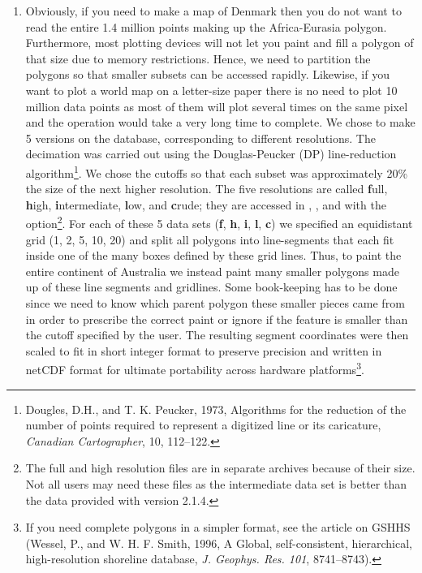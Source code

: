 \begin{enumerate}
\item Obviously, if you need to make a map of Denmark then
you do not want to read the entire 1.4 million points making
up the Africa-Eurasia polygon.  Furthermore, most plotting
devices will not let you paint and fill a polygon of that size
due to memory restrictions.  Hence, we need to partition the
polygons so that smaller subsets can be accessed rapidly.
Likewise, if you want to plot a world map on a letter-size paper
there is no need to plot 10 million data points as most of them
will plot several times on the same pixel and the operation
would take a very long time to complete.  We chose to make 5
versions on the database, corresponding to different resolutions.
The decimation was carried out using the Douglas-Peucker (DP)
line-reduction algorithm\footnote{Dougles, D.H., and T. K. Peucker,
1973, Algorithms for the reduction of the number of points
required to represent a digitized line or its caricature,
{\it Canadian Cartographer}, 10, 112--122.}.  We chose the
cutoffs so that each subset was approximately 20\% the size of
the next higher resolution.  The five resolutions are called
{\bf f}ull, {\bf h}igh, {\bf i}ntermediate, {\bf l}ow, and
{\bf c}rude; they are accessed in , ,
and  with the  option\footnote{ The full
and high resolution files are in separate archives because of their
size.  Not all users may need these files as the intermediate data
set is better than the data provided with version 2.1.4.}.  For each of
these 5 data sets ({\bf f}, {\bf h}, {\bf i}, {\bf l}, {\bf c})
we specified an equidistant grid (1\DS, 2\DS, 5\DS,
10\DS, 20\DS) and split all polygons into line-segments
that each fit inside one of the many boxes defined by these grid
lines.  Thus, to paint the entire continent of Australia we
instead paint many smaller polygons made up of these line
segments and gridlines.  Some book-keeping has to be done since
we need to know which parent polygon these smaller pieces came
from in order to prescribe the correct paint or ignore if the
feature is smaller than the cutoff specified by the user.  The
resulting segment coordinates were then scaled to fit in short
integer format to preserve precision and written in netCDF format
for ultimate portability across hardware platforms\footnote{
If you need complete polygons in a simpler format, see the article
on GSHHS (Wessel, P., and W. H. F. Smith, 1996, A Global, self-consistent, hierarchical, high-resolution shoreline database,
{\it J. Geophys. Res. 101}, 8741--8743).}.


\end{enumerate}
